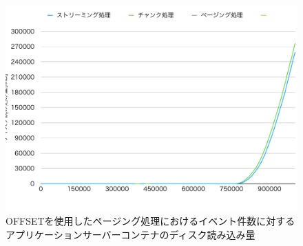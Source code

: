 \documentclass[../../../../../main]{subfiles}
\begin{document}
    \begin{figure}[H]
        \centering
        \includegraphics[width=12cm]{graph}
        \caption{OFFSETを使用したページング処理におけるイベント件数に対するアプリケーションサーバーコンテナのディスク読み込み量}
        \label{fig:each-way-app-disk-out-app_1_1024-db_1_1024}
    \end{figure}
\end{document}
